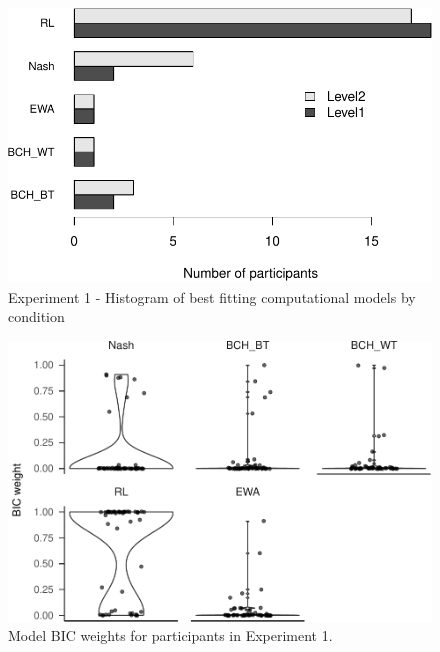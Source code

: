 \documentclass[
  english,
  man,floatsintext]{apa6}
\begin{document}
\begin{figure}

{\centering \includegraphics[width=\textwidth]{paper_draft_2021_files/figure-latex/exp1-comp-models-1} 

}

\caption{Experiment 1 - Histogram of best fitting computational models by condition}\label{fig:exp1-comp-models}
\end{figure}



\begin{figure}

{\centering \includegraphics{paper_draft_2021_files/figure-latex/xp1-BIC-weigths-1} 

}

\caption{Model BIC weights for participants in Experiment 1.}\label{fig:xp1-BIC-weigths}
\end{figure}
\end{document}
